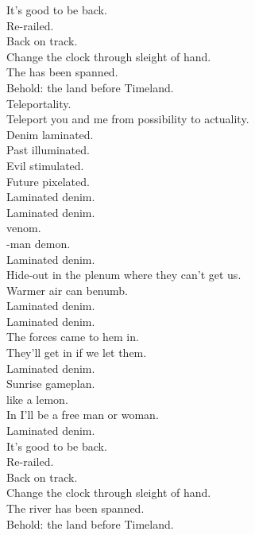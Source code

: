 
\label{album:laminated-denim}




It's good to be back. \\
Re-railed. \\
Back on track. \\
Change the clock through sleight of hand. \\
The  has been spanned. \\
Behold: the land before Timeland. \\

Teleportality. \\
Teleport you and me from possibility to actuality. \\
Denim laminated. \\
Past illuminated. \\
Evil stimulated. \\
Future pixelated. \\

Laminated denim. \\

Laminated denim. \\
 venom. \\
-man demon. \\
Laminated denim. \\
Hide-out in the plenum where they can't get us. \\
Warmer air can benumb. \\
Laminated denim. \\

Laminated denim. \\
The forces came to hem in. \\
They'll get in if we let them. \\
Laminated denim. \\
Sunrise gameplan. \\
 like a lemon. \\
In  I'll be a free man or woman. \\
Laminated denim. \\

It's good to be back. \\
Re-railed. \\
Back on track. \\
Change the clock through sleight of hand. \\
The river has been spanned. \\
Behold: the land before Timeland. \\

